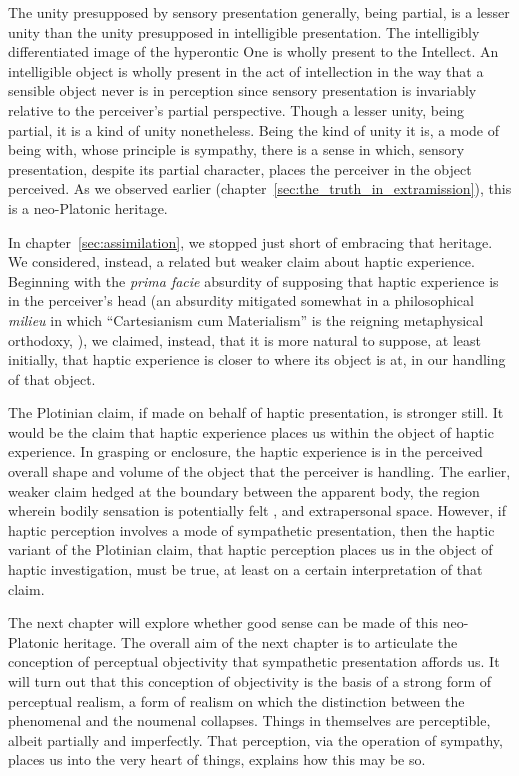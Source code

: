 The unity presupposed by sensory presentation generally, being partial, is a lesser unity than the unity presupposed in intelligible presentation. The intelligibly differentiated image of the hyperontic One is wholly present to the Intellect. An intelligible object is wholly present in the act of intellection in the way that a sensible object never is in perception since sensory presentation is invariably relative to the perceiver's partial perspective. Though a lesser unity, being partial, it is a kind of unity nonetheless. Being the kind of unity it is, a mode of being with, whose principle is sympathy, there is a sense in which, sensory presentation, despite its partial character, places the perceiver in the object perceived. As we observed earlier (chapter~\ref{sec:the_truth_in_extramission}), this is a neo-Platonic heritage. 

In chapter~\ref{sec:assimilation}, we stopped just short of embracing that heritage. We considered, instead, a related but weaker claim about haptic experience. Beginning with the \emph{prima facie} absurdity of supposing that haptic experience is in the perceiver's head (an absurdity mitigated somewhat in a philosophical \emph{milieu} in which ``Cartesianism cum Materialism'' is the reigning metaphysical orthodoxy, \citealt{Putnam:1993kx,Putnam:1994kx,Putnam:1999eu}), we claimed, instead, that it is more natural to suppose, at least initially, that haptic experience is closer to where its object is at, in our handling of that object. 

The Plotinian claim, if made on behalf of haptic presentation, is stronger still. It would be the claim that haptic experience places us within the object of haptic experience. In grasping or enclosure, the haptic experience is in the perceived overall shape and volume of the object that the perceiver is handling. The earlier, weaker claim hedged at the boundary between the apparent body, the region wherein bodily sensation is potentially felt \citep{Martin:1992aa}, and extrapersonal space. However, if haptic perception involves a mode of sympathetic presentation, then the haptic variant of the Plotinian claim, that haptic perception places us in the object of haptic investigation, must be true, at least on a certain interpretation of that claim. 

The next chapter will explore whether good sense can be made of this neo-Platonic heritage. The overall aim of the next chapter is to articulate the conception of perceptual objectivity that sympathetic presentation affords us. It will turn out that this conception of objectivity is the basis of a strong form of perceptual realism, a form of realism on which the distinction between the phenomenal and the noumenal collapses. Things in themselves are perceptible, albeit partially and imperfectly. That perception, via the operation of sympathy, places us into the very heart of things, explains how this may be so.





